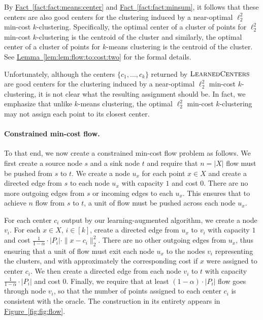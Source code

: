 \documentclass[10pt,a4paper]{amsart}
\newcommand{\namedref}[2]{\hyperref[#2]{#1~\ref*{#2}}}
\newcommand{\lemref}[1]{\namedref{Lemma}{lem:#1}}
\newcommand{\factref}[1]{\namedref{Fact}{fact:#1}}
\newcommand{\figref}[1]{\namedref{Figure}{fig:#1}}
\def \LearnedCenters    {\mdef{\textsc{LearnedCenters}}}
\newcommand{\mdef}[1]{{\ensuremath{#1}}\xspace}  %
\begin{document}
By \factref{fact:means:center} and \factref{fact:minsum}, it follows that these centers are also good centers for the clustering induced by a near-optimal $\ell_2^2$ min-cost $k$-clustering.  
Specifically, the optimal center of a cluster of points for $\ell_2^2$ min-cost $k$-clustering is the centroid of the cluster and similarly, the optimal center of a cluster of points for $k$-means clustering is the centroid of the cluster. 
See \lemref{lem:flow:to:cost:two} for the formal details. 

Unfortunately, although the centers $\{c_1,\ldots,c_k\}$ returned by $\LearnedCenters$ are good centers for the clustering induced by a near-optimal $\ell_2^2$ min-cost $k$-clustering, it is not clear what the resulting assignment should be. 
In fact, we emphasize that unlike $k$-means clustering, the optimal $\ell_2^2$ min-cost $k$-clustering may not assign each point to its closest center. 

\paragraph{Constrained min-cost flow.}
To that end, we now create a constrained min-cost flow problem as follows. 
We first create a source node $s$ and a sink node $t$ and require that $n=|X|$ flow must be pushed from $s$ to $t$. 
We create a node $u_x$ for each point $x\in X$ and create a directed edge from $s$ to each node $u_x$ with capacity $1$ and cost $0$. 
There are no more outgoing edges from $s$ or incoming edges to each $u_x$. 
This ensures that to achieve $n$ flow from $s$ to $t$, a unit of flow must be pushed across each node $u_x$. 

For each center $c_i$ output by our learning-augmented algorithm, we create a node $v_i$. 
For each $x\in X$, $i\in[k]$, create a directed edge from $u_x$ to $v_i$ with capacity $1$ and cost $\frac{1}{1-\alpha}\cdot|P_i|\cdot\|x-c_i\|_2^2$. 
There are no other outgoing edges from $u_x$, thus ensuring that a unit of flow must exit each node $u_x$ to the nodes $v_i$ representing the clusters, and with approximately the corresponding cost if $x$ were assigned to center $c_i$. 
We then create a directed edge from each node $v_i$ to $t$ with capacity $\frac{1}{1-\alpha}\cdot|P_i|$ and cost $0$. 
Finally, we require that at least $(1-\alpha)\cdot|P_i|$ flow goes through node $v_i$, so that the number of points assigned to each center $c_i$ is consistent with the oracle.  
The construction in its entirety appears in \figref{fig:flow}. 
\end{document}
